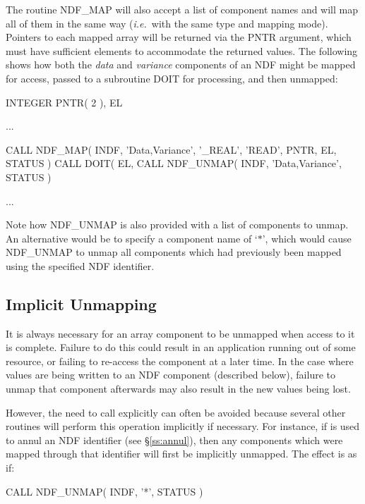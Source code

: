 \documentclass[twoside,11pt,nolof]{starlink}
\providecommand{\st}[1]{{\emph{#1}}}
\begin{document}
The routine NDF\_MAP will also accept a list of component names and will map
all of them in the same way (\st{i.e.}\ with the same type and mapping mode).
Pointers to each mapped array will be returned via the PNTR argument, which
must have sufficient elements to accommodate the returned values.
The following shows how both the \st{data\/} and \st{variance\/} components of an
NDF  might be mapped for access, passed to a subroutine DOIT for processing, and
then unmapped:

\small
\begin{terminalv}
      INTEGER PNTR( 2 ), EL

      ...

      CALL NDF_MAP( INDF, 'Data,Variance', '_REAL', 'READ', PNTR, EL, STATUS )
      CALL DOIT( EL, %
      CALL NDF_UNMAP( INDF, 'Data,Variance', STATUS )

      ...
\end{terminalv}
\normalsize

Note how NDF\_UNMAP is also provided with a list of components to unmap.
An alternative would be to specify a component name of `$*$', which would
cause NDF\_UNMAP to unmap all components which had previously been mapped
using the specified NDF identifier.

\subsection{\label{ss:implicitunmapping}Implicit Unmapping}

It is always necessary for an array component to be unmapped when access to
it is complete.
Failure to do this could result in an application running out of some resource,
or failing to re-access the component at a later time.
In the case where values are being written to an NDF component (described
below), failure to unmap that component afterwards may also result in the
new values being lost.

However, the need to call  explicitly can often be avoided because
several other routines will perform this operation implicitly if necessary.
For instance, if  is used to annul an NDF identifier (see
\S\ref{ss:annul}), then any components which were mapped through that
identifier will first be implicitly unmapped.
The effect is as if:

\small
\begin{terminalv}
      CALL NDF_UNMAP( INDF, '*', STATUS )
\end{terminalv}
\normalsize
\end{document}
